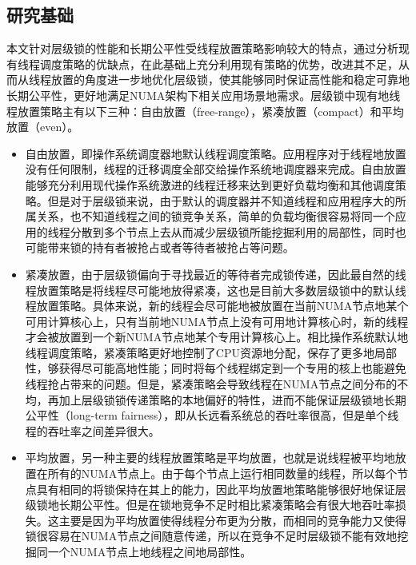 \subsection{研究基础}
本文针对层级锁的性能和长期公平性受线程放置策略影响较大的特点，通过分析现有线程调度策略的优缺点，在此基础上充分利用现有策略的优势，改进其不足，从而从线程放置的角度进一步地优化层级锁，使其能够同时保证高性能和稳定可靠地长期公平性，更好地满足NUMA架构下相关应用场景地需求。层级锁中现有地线程放置策略主有以下三种：自由放置（free-range），紧凑放置（compact）和平均放置（even）。
\begin{itemize}
\item 自由放置，即操作系统调度器地默认线程调度策略。应用程序对于线程地放置没有任何限制，线程的迁移调度全部交给操作系统地调度器来完成。自由放置能够充分利用现代操作系统激进的线程迁移来达到更好负载均衡和其他调度策略。但是对于层级锁来说，由于默认的调度器并不知道线程和应用程序大的所属关系，也不知道线程之间的锁竞争关系，简单的负载均衡很容易将同一个应用的线程分散到多个节点上去从而减少层级锁所能挖掘利用的局部性，同时也可能带来锁的持有者被抢占或者等待者被抢占等问题。
\item 紧凑放置，由于层级锁偏向于寻找最近的等待者完成锁传递，因此最自然的线程放置策略是将线程尽可能地放得紧凑，这也是目前大多数层级锁中的默认线程放置策略。具体来说，新的线程会尽可能地被放置在当前NUMA节点地某个可用计算核心上，只有当前地NUMA节点上没有可用地计算核心时，新的线程才会被放置到一个新NUMA节点地某个专用计算核心上。相比操作系统默认地线程调度策略，紧凑策略更好地控制了CPU资源地分配，保存了更多地局部性，够获得尽可能高地性能；同时将每个线程绑定到一个专用的核上也能避免线程抢占带来的问题。但是，紧凑策略会导致线程在NUMA节点之间分布的不均，再加上层级锁锁传递策略的本地偏好的特性，进而不能保证层级锁地长期公平性（long-term fairness），即从长远看系统总的吞吐率很高，但是单个线程的吞吐率之间差异很大。

\item 平均放置，另一种主要的线程放置策略是平均放置，也就是说线程被平均地放置在所有的NUMA节点上。由于每个节点上运行相同数量的线程，所以每个节点具有相同的将锁保持在其上的能力，因此平均放置地策略能够很好地保证层级锁地长期公平性。但是在锁地竞争不足时相比紧凑策略会有很大地吞吐率损失。这主要是因为平均放置使得线程分布更为分散，而相同的竞争能力又使得锁很容易在NUMA节点之间随意传递，所以在竞争不足时层级锁不能有效地挖掘同一个NUMA节点上地线程之间地局部性。
\end{itemize}
